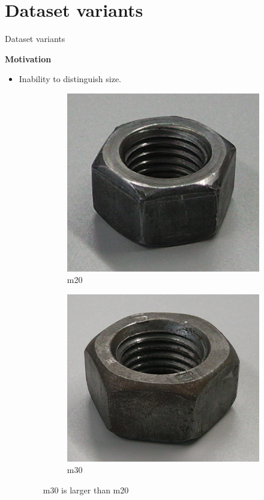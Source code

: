 \documentclass{beamer}
\begin{document}
\section{Dataset variants}

\begin{frame}{Dataset variants}
\label{slide:motivvariants}

	\textbf{Motivation}
	\begin{small}
	
		\begin{itemize}
			\item Inability to distinguish size.
				\begin{figure}
				\centering
				\begin{subfigure}{.2\textwidth}
  					\centering
  					\includegraphics[width=.35\linewidth]{images/M20}
  					\caption{m20}
  					\label{Fig:size1}
				\end{subfigure}%
				\begin{subfigure}{.2\textwidth}
  					\centering
  					\includegraphics[width=.35\linewidth]{images/M30}
  					\caption{m30}
  					\label{Fig:size2}
				\end{subfigure}%
				\caption{m30 is larger than m20}
				\label{Fig:size}
				\end{figure}
				

\end{itemize}
\end{small}
\end{frame}
\end{document}

